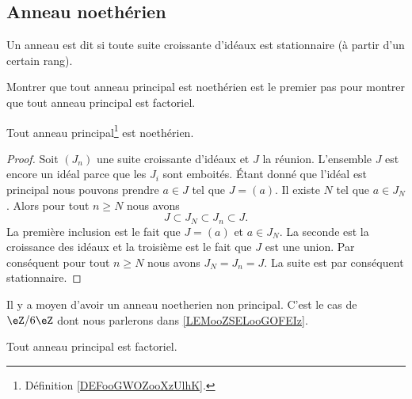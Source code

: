 \subsection{Anneau noethérien}

\begin{definition}      \label{DEFooPWMHooCnrQuJ}
    Un anneau est dit  si toute suite croissante d'idéaux est stationnaire (à partir d'un certain rang).
\end{definition}

Montrer que tout anneau principal est noethérien est le premier pas pour montrer que tout anneau principal est factoriel.

\begin{lemma}       \label{LEMooHQPVooTfkhRV}
    Tout anneau principal\footnote{Définition \ref{DEFooGWOZooXzUlhK}.} est noethérien.
\end{lemma}

\begin{proof}
    Soit \( (J_n)\) une suite croissante d'idéaux et \( J\) la réunion. L'ensemble \( J\) est encore un idéal parce que les \( J_i\) sont emboités. Étant donné que l'idéal est principal nous pouvons prendre \( a\in J\) tel que \( J=(a)\). Il existe \( N\) tel que \( a\in J_N\). Alors pour tout \( n\geq N\) nous avons
    \begin{equation}
        J\subset J_N\subset J_n\subset J.
    \end{equation}
    La première inclusion est le fait que \( J=(a)\) et \( a\in J_N\). La seconde est la croissance des idéaux et la troisième est le fait que \( J\) est une union. Par conséquent pour tout \( n\geq N\) nous avons \( J_N=J_n=J\). La suite est par conséquent stationnaire.
\end{proof}

\begin{example}
    Il y a moyen d'avoir un anneau noetherien non principal. C'est le cas de \( \eZ/6\eZ\) dont nous parlerons dans \ref{LEMooZSELooGOFEIz}.
\end{example}

\begin{theorem}      \label{THOooANCAooBChmwp}
    Tout anneau principal est factoriel.
\end{theorem}

